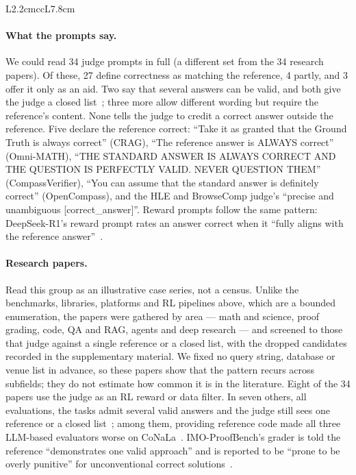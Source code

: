 \begin{table}[htbp]
\begin{tabular}{L{2.2cm}ccL{7.8cm}}
\bottomrule
\end{tabular}
\end{table}

\paragraph{What the prompts say.} We could read 34 judge prompts in full (a different set from the 34 research papers). Of these, 27 define correctness as matching the reference, 4 partly, and 3 offer it only as an aid. Two say that several answers can be valid, and both give the judge a closed list~\citep{ni2024mixeval,vu2023freshllms}; three more allow different wording but require the reference's content. None tells the judge to credit a correct answer outside the reference. Five declare the reference correct: ``Take it as granted that the Ground Truth is always correct'' (CRAG), ``The reference answer is ALWAYS correct'' (Omni-MATH), ``THE STANDARD ANSWER IS ALWAYS CORRECT AND THE QUESTION IS PERFECTLY VALID. NEVER QUESTION THEM'' (CompassVerifier), ``You can assume that the standard answer is definitely correct'' (OpenCompass), and the HLE and BrowseComp judge's ``precise and unambiguous [correct\_answer]''. Reward prompts follow the same pattern: DeepSeek-R1's reward prompt rates an answer correct when it ``fully aligns with the reference answer''~\citep{deepseek2025r1}.

\paragraph{Research papers.} Read this group as an illustrative case series, not a census. Unlike the benchmarks, libraries, platforms and RL pipelines above, which are a bounded enumeration, the papers were gathered by area --- math and science, proof grading, code, QA and RAG, agents and deep research --- and screened to those that judge against a single reference or a closed list, with the dropped candidates recorded in the supplementary material. We fixed no query string, database or venue list in advance, so these papers show that the pattern recurs across subfields; they do not estimate how common it is in the literature. Eight of the 34 papers use the judge as an RL reward or data filter. In seven others, all evaluations, the tasks admit several valid answers and the judge still sees one reference or a closed list~\citep{kamalloo2023evaluating,wang2023evouna,zheng2025deepresearcher,du2025deepresearchbench,zhuo2024icescore,tong2024codejudge,petrov2025proofbluff}; among them, providing reference code made all three LLM-based evaluators worse on CoNaLa~\citep{tong2024codejudge}. IMO-ProofBench's grader is told the reference ``demonstrates one valid approach'' and is reported to be ``prone to be overly punitive'' for unconventional correct solutions~\citep{luong2025imobench}.

